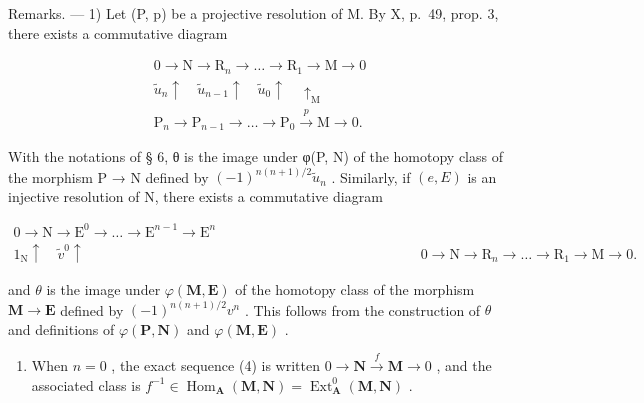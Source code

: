 Remarks. --- 1) Let (P, p) be a projective resolution of M. By X, p.~49, prop. 3, there exists a commutative diagram

\[
\begin{array}{c} 0 \longrightarrow \mathrm{N} \longrightarrow \mathrm{R} _ {n} \longrightarrow \dots \longrightarrow \mathrm{R} _ {1} \longrightarrow \mathrm{M} \longrightarrow 0 \\ \tilde {u} _ {n} \uparrow \quad \tilde {u} _ {n - 1} \uparrow \quad \tilde {u} _ {0} \uparrow \quad \uparrow_ {\mathrm{M}} \\ \mathrm{P} _ {n} \longrightarrow \mathrm{P} _ {n - 1} \longrightarrow \dots \longrightarrow \mathrm{P} _ {0} \xrightarrow {p} \mathrm{M} \longrightarrow 0. \end{array}
\]

With the notations of § 6, θ is the image under φ(P, N) of the homotopy class of the morphism P → N defined by \((-1)^{n(n+1)/2} \tilde{u}_{n}\) . Similarly, if \((e, E)\) is an injective resolution of N, there exists a commutative diagram

\[
\begin{array}{c} 0 \longrightarrow \mathrm{N} \longrightarrow \mathrm{E} ^ {0} \longrightarrow \dots \longrightarrow \mathrm{E} ^ {n - 1} \longrightarrow \mathrm{E} ^ {n} \\ 1 _ {\mathrm{N}} \uparrow \quad \tilde {v} ^ {0} \uparrow \quad \quad \quad \quad \quad \quad \quad \quad \quad \quad \quad \quad \quad \quad \quad \quad \quad \quad \quad \quad \quad \quad \quad \quad 0 \longrightarrow \mathrm{N} \longrightarrow \mathrm{R} _ {n} \longrightarrow \dots \longrightarrow \mathrm{R} _ {1} \longrightarrow \mathrm{M} \longrightarrow 0. \end{array}
\]

and \(\theta\) is the image under \(\varphi(\mathbf{M},\mathbf{E})\) of the homotopy class of the morphism \(\mathbf{M}\to\mathbf{E}\) defined by \((-1)^{n(n+1)/2}v^{n}\) . This follows from the construction of \(\theta\) and definitions of \(\varphi(\mathbf{P},\mathbf{N})\) and \(\varphi(\mathbf{M},\mathbf{E})\) .

\begin{enumerate}
\def\labelenumi{\arabic{enumi})}
\setcounter{enumi}{1}
\tightlist
\item
  When \(n = 0\) , the exact sequence (4) is written \(0 \to \mathbf{N} \xrightarrow{f} \mathbf{M} \to 0\) , and the associated class is \(f^{-1} \in \operatorname{Hom}_{\mathbf{A}}(\mathbf{M}, \mathbf{N}) = \operatorname{Ext}_{\mathbf{A}}^{0}(\mathbf{M}, \mathbf{N})\) .
\end{enumerate}

